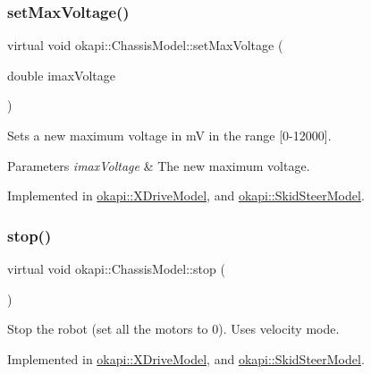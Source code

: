 \subsubsection{\texorpdfstring{setMaxVoltage()}{setMaxVoltage()}}
{\footnotesize\ttfamily virtual void okapi\+::\+Chassis\+Model\+::set\+Max\+Voltage (\begin{DoxyParamCaption}\item[{double}]{imax\+Voltage }\end{DoxyParamCaption})\hspace{0.3cm}{\ttfamily [pure virtual]}}

Sets a new maximum voltage in mV in the range {\ttfamily \mbox{[}0-\/12000\mbox{]}}.


\begin{DoxyParams}{Parameters}
{\em imax\+Voltage} & The new maximum voltage. \\
\hline
\end{DoxyParams}


Implemented in \mbox{\hyperlink{classokapi_1_1XDriveModel_a6d001a2147ecb642f60cd21ac73c64ea}{okapi\+::\+X\+Drive\+Model}}, and \mbox{\hyperlink{classokapi_1_1SkidSteerModel_ad4dc0f8e3877b23ffb8ae58903bdffb7}{okapi\+::\+Skid\+Steer\+Model}}.

\mbox{\label{classokapi_1_1ChassisModel_ad67ad9abae41c5441c2a2d671d0c8a55}} 
\subsubsection{\texorpdfstring{stop()}{stop()}}
{\footnotesize\ttfamily virtual void okapi\+::\+Chassis\+Model\+::stop (\begin{DoxyParamCaption}{ }\end{DoxyParamCaption})\hspace{0.3cm}{\ttfamily [pure virtual]}}

Stop the robot (set all the motors to 0). Uses velocity mode. 

Implemented in \mbox{\hyperlink{classokapi_1_1XDriveModel_a2fe09b755e8a6f321d6365cedc774e04}{okapi\+::\+X\+Drive\+Model}}, and \mbox{\hyperlink{classokapi_1_1SkidSteerModel_a98d212cff8bad647ada6bcd3054c7581}{okapi\+::\+Skid\+Steer\+Model}}.

\mbox{\label{classokapi_1_1ChassisModel_a185a667048f84c3a0fced6882c5f7980}} 
